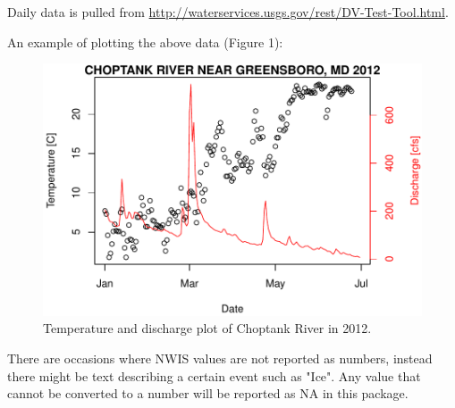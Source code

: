 \documentclass[a4paper,11pt]{article}
\begin{document}
Daily data is pulled from \url{http://waterservices.usgs.gov/rest/DV-Test-Tool.html}. 

An example of plotting the above data (Figure 1):

\begin{Schunk}
\end{Schunk}
\newpage

\begin{figure}
\begin{center}
\includegraphics{dataRetrieval-fig1}
\end{center}
\caption{Temperature and discharge plot of Choptank River in 2012.}
\end{figure}


There are occasions where NWIS values are not reported as numbers, instead there might be text describing a certain event such as "Ice".  Any value that cannot be converted to a number will be reported as NA in this package.


\end{document}

